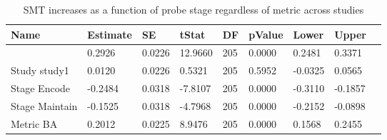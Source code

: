 \begin{table}
\centering
\begin{tabular}[0.2em]{@{}lllllllll@{}}\toprule
Name & Estimate & SE & tStat & DF & pValue & Lower & Upper\\\toprule[0.2em]
(Intercept) & 0.2926 & 0.0226 & 12.9660 & 205 & 0.0000 & 0.2481 & 0.3371 \\\midrule
Study study1 & 0.0120 & 0.0226 & 0.5321 & 205 & 0.5952 & -0.0325 & 0.0565 \\\midrule
Stage Encode & -0.2484 & 0.0318 & -7.8107 & 205 & 0.0000 & -0.3110 & -0.1857 \\\midrule
Stage Maintain & -0.1525 & 0.0318 & -4.7968 & 205 & 0.0000 & -0.2152 & -0.0898 \\\midrule
Metric BA & 0.2012 & 0.0225 & 8.9476 & 205 & 0.0000 & 0.1568 & 0.2455 \\\bottomrule[0.2em]
\end{tabular}
\caption{SMT increases as a function of probe stage regardless of metric across studies\label{tabel:SMTlme}}
\end{table}
